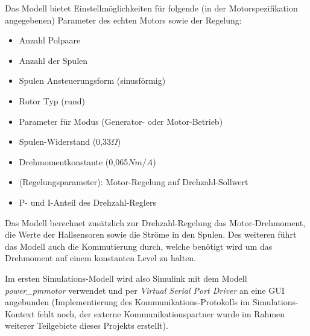 Das Modell bietet Einstellmöglichkeiten für folgende (in der Motorspezifikation angegebenen) Parameter des echten Motors sowie der Regelung:
\begin{itemize}
	\item Anzahl Polpaare
	\item Anzahl der Spulen
	\item Spulen Ansteuerungsform (sinusförmig)
	\item Rotor Typ (rund)
	\item Parameter für Modus (Generator- oder Motor-Betrieb)
	\item Spulen-Widerstand (0,33$\Omega$) 
	\item Drehmomentkonstante (0,065$Nm/A$)
	\item (Regelungsparameter): Motor-Regelung auf Drehzahl-Sollwert 
	\item P- und I-Anteil des Drehzahl-Reglers
\end{itemize}

Das Modell berechnet zusätzlich zur Drehzahl-Regelung das Motor-Drehmoment, die Werte der Hallsensoren sowie die Ströme in den Spulen. Des weiteren führt das Modell auch die Kommutierung durch, welche benötigt wird um das Drehmoment auf einem konstanten Level zu halten.

Im ersten Simulations-Modell wird also Simulink mit dem Modell \textit{power\_pmmotor} verwendet und per \textit{Virtual Serial Port Driver} an eine GUI angebunden (Implementierung des Kommunikations-Protokolls im Simulations-Kontext fehlt noch, der externe Kommunikationspartner wurde im Rahmen weiterer Teilgebiete dieses Projekts erstellt).


